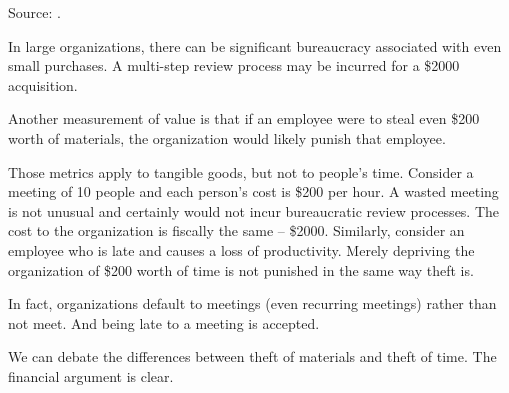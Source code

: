 Source: \cite{1995_Grove}.

In large organizations, there can be significant bureaucracy associated with even small purchases. A multi-step review process may be incurred for a \$2000 acquisition.

Another measurement of value is that if an employee were to steal even \$200 worth of materials, the organization would likely punish that employee.


Those metrics apply to tangible goods, but not to people's time. Consider a meeting of 10 people and each person's cost is \$200 per hour. A wasted meeting is not unusual and certainly would not incur bureaucratic review processes. The cost to the organization is fiscally the same -- \$2000. Similarly, consider an employee who is late and causes a loss of productivity. Merely depriving the organization of \$200 worth of time is not punished in the same way theft is.

In fact, organizations default to meetings (even recurring meetings) rather than not meet. And being late to a meeting is accepted. 

We can debate the differences between theft of materials and theft of time. The financial argument is clear. 
